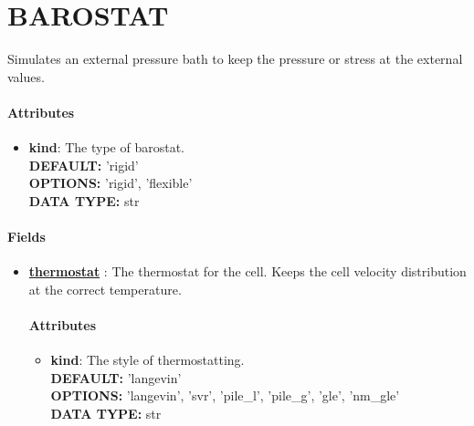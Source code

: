 \section{BAROSTAT}
\label{BAROSTAT}
Simulates an external pressure bath to keep the pressure or stress at the external values.
\paragraph{Attributes}
 \begin{itemize}
\item {\bf kind}:
 The type of barostat.
{\\ \bf DEFAULT: }'rigid'
{\\ \bf OPTIONS: }'rigid', 'flexible'
{\\ \bf DATA TYPE: }str
\end{itemize}
 
\paragraph{Fields}
 \begin{itemize}
\item {\bf \hyperref[THERMOSTATS]{thermostat} }:
 The thermostat for the cell. Keeps the cell velocity distribution at the correct temperature.
\paragraph{Attributes}
 \begin{itemize}
\item {\bf kind}:
 The style of thermostatting.
{\\ \bf DEFAULT: }'langevin'
{\\ \bf OPTIONS: }'langevin', 'svr', 'pile\_l', 'pile\_g', 'gle', 'nm\_gle'
{\\ \bf DATA TYPE: }str
\end{itemize}
 
\end{itemize}
 
